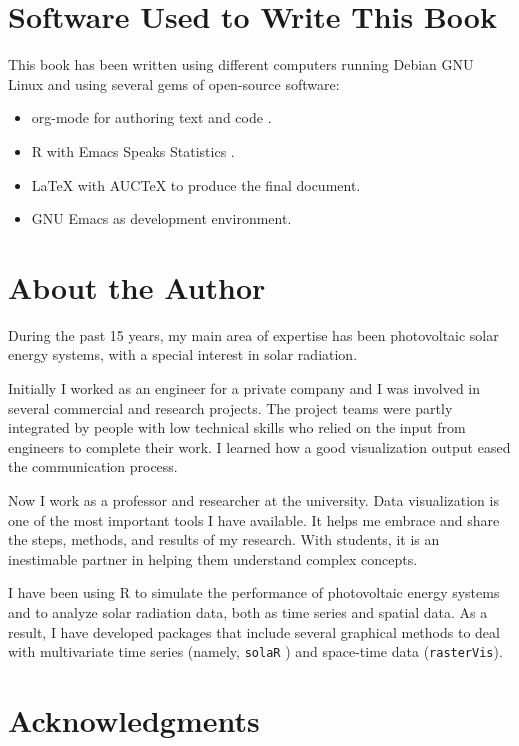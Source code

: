 \section{Software Used to Write This Book}
\label{sec:software-book}

This book has been written using different computers running Debian
GNU Linux and using several gems of open-source software:
\begin{itemize}
\item \textsf{org-mode} for authoring text and code
  \cite{Schulte.Davison.ea2012}.
\item \textsf{R} \cite{RDevelopmentCoreTeam2013} with \textsf{Emacs
    Speaks Statistics} \cite{Rossini.Heiberger.ea2004}.
\item \LaTeX{} with AUC\TeX{} to produce the final document.
\item \textsf{GNU Emacs} as development environment.
\end{itemize}

\section{About the Author}
\label{sec:aboutMe}

During the past 15 years, my main area of expertise has been
photovoltaic solar energy systems, with a special interest in solar
radiation.

Initially I worked as an engineer for a private company and I was
involved in several commercial and research projects. The project
teams were partly integrated by people with low technical skills who
relied on the input from engineers to complete their work. I learned
how a good visualization output eased the communication process.

Now I work as a professor and researcher at the university. Data
visualization is one of the most important tools I have available. It
helps me embrace and share the steps, methods, and results of my
research. With students, it is an inestimable partner in helping them
understand complex concepts.

I have been using \textsf{R} to simulate the performance of
photovoltaic energy systems and to analyze solar radiation data,
both as time series and spatial data. As a result, I have
developed packages that include several graphical methods to deal
with multivariate time series (namely, \texttt{solaR}
\cite{Perpinan2012b}) and space-time data (\texttt{rasterVis}).

\section{Acknowledgments}
\label{sec:acknow}

